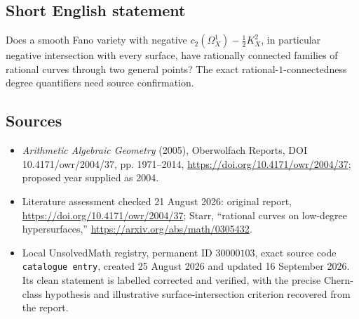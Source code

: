 \documentclass[11pt]{article}
\begin{document}
\subsection{Short English statement}
Does a smooth Fano variety with negative $c_2(\Omega_X^1)-\frac12K_X^2$, in particular negative intersection with every surface, have rationally connected families of rational curves through two general points? The exact rational-$1$-connectedness degree quantifiers need source confirmation.
\subsection{Sources}
\begin{itemize}
\item \emph{Arithmetic Algebraic Geometry} (2005), Oberwolfach Reports, DOI 10.4171/owr/2004/37, pp. 1971--2014, \url{https://doi.org/10.4171/owr/2004/37}; proposed year supplied as 2004.
\item Literature assessment checked 21 August 2026: original report, \url{https://doi.org/10.4171/owr/2004/37}; Starr, ``rational curves on low-degree hypersurfaces,'' \url{https://arxiv.org/abs/math/0305432}.
\item Local UnsolvedMath registry, permanent ID $30000103$, exact source code \texttt{catalogue entry}, created 25 August 2026 and updated 16 September 2026. Its clean statement is labelled corrected and verified, with the precise Chern-class hypothesis and illustrative surface-intersection criterion recovered from the report.
\end{itemize}
\end{document}
